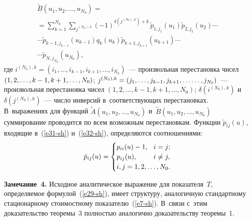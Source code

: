 \begin{multicols}{2}

\noindent
\begin{multline}
\tilde{B}(u_{1} ,u_{2} ,\ldots ,u_{N_0} )={}\\
{}=\sum\limits_{k=1}^{N_0}  
\sum\limits_{j^{(N_0),k} } (-1)^{\delta (j^{(N_0),k})+k} \, \tilde{p}_{1,j_{1} } 
(u_{1}) \tilde{p}_{2,j_{2} } (u_{2} )\cdots\\
\cdots \tilde{p}_{k-1,j_{k-1} } 
(u_{k-1} )q_{k} (u_{k} )\tilde{p}_{k+1,j_{k+1} } (u_{k+1} )\cdots\\
\cdots 
\tilde{p}_{N,j_{N_0} } (u_{N_0} ),\label{e32-sh}
\end{multline}
где $i^{(N_0),k}=(i_1,\dots,i_{k-1},i_{k+1},\dots,i_{N_0})$~--- произвольная 
перестановка чисел $(1,2,\ldots,k-1,\linebreak k+1,\ldots,N_0)$; 
$j^{(N_0),k}\hm=(j_1,\ldots ,j_{k-1},j_{k+1},\ldots\linebreak
\ldots ,j_{N_0})$~--- произвольная 
перестановка чисел $(1,2,\ldots ,k-1,k+1,\ldots,N_0)$; $\delta(i^{(N_0),k})$ 
и~$\delta(j^{(N_0),k})$~--- число инверсий в~соответствующих перестановках. 
В~выражениях для функций $\tilde{A}(u_1,u_2,\ldots,u_{N_0})$ 
и~$\tilde{B}(u_1,u_2,\ldots,u_{N_0})$ суммирование проводится по всем возможным 
перестановкам.
Функции $\tilde{p}_{ij}(u)$,  входящие в~(\ref{e31-sh}) и~(\ref{e32-sh}), 
определяются со\-от\-но\-ше\-ни\-ями:
\begin{equation}
\tilde{p}_{ij} (u)=
\begin{cases}
  p_{ii} (u)- 1, &\hspace*{-12mm} i=j;\\
 p_{ij} (u), &\hspace*{-12mm}i\ne j, \\
i,j=1,2,\dots,N_0. 
\end{cases} 
\label{e33-sh}
\end{equation}

\noindent
\textbf{Замечание~4.} Исходное аналитическое выражение для показателя~$T$, 
определяемое формулой~(\ref{e29-sh}), имеет структуру, аналогичную стандартному 
стационарному стоимостному показателю~(\ref{e7-sh}). В~связи с~этим доказательство тео\-ре\-мы~3 
пол\-ностью аналогично доказательству тео\-ре\-мы~1.

\smallskip


\end{multicols}
